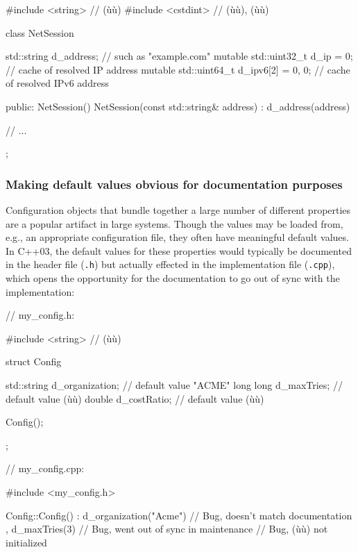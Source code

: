\begin{emcppslisting}
#include <string>   // (ù{}ù)
#include <cstdint>  // (ù{}ù), (ù{}ù)

class NetSession
{
    std::string d_address;                     // such as "example.com"
    mutable std::uint32_t d_ip      = 0;       // cache of resolved IP address
    mutable std::uint64_t d_ipv6[2] = {0, 0};  // cache of resolved IPv6 address

public:
    NetSession() { }
    NetSession(const std::string& address) : d_address(address) { }

    // ...
};
\end{emcppslisting}
    

\subsubsection[Making default values obvious for documentation purposes]{Making default values obvious for documentation purposes}\label{making-default-values-obvious-for-documentation-purposes}

Configuration objects that bundle together a large number of different
properties are a popular artifact in large systems. Though the values
may be loaded from, e.g., an appropriate configuration file, they often
have meaningful default values. In C++03, the default values for these
properties would typically be documented in the header file
(\lstinline!.h!) but actually effected in the implementation file
(\lstinline!.cpp!), which opens the opportunity for the documentation to go
out of sync with the implementation:

\begin{emcppslisting}
// my_config.h:

#include <string>  // (ù{}ù)

struct Config
{
   std::string d_organization;  // default value "ACME"
   long long   d_maxTries;      // default value (ù{}ù)
   double      d_costRatio;     // default value (ù{}ù)

   Config();
};

// my_config.cpp:

#include <my_config.h>

Config::Config()
    : d_organization("Acme")    // Bug, doesn't match documentation
    , d_maxTries(3)             // Bug, went out of sync in maintenance
{ }                             // Bug, (ù{}ù) not initialized
\end{emcppslisting}
    

